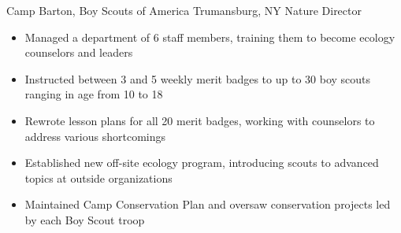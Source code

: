 
        {Camp Barton, Boy Scouts of America}
        {Trumansburg, NY}
        {Nature Director}
        {}{
    \begin{itemize}
        \item Managed a department of 6 staff members, training them to become ecology counselors and leaders
        \item Instructed between 3 and 5 weekly merit badges to up to 30 boy scouts ranging in age from 10 to 18
        \item Rewrote lesson plans for all 20 merit badges, working with counselors to address various shortcomings
        \item Established new off-site ecology program, introducing scouts to advanced topics at outside organizations
        \item Maintained Camp Conservation Plan and oversaw conservation projects led by each Boy Scout troop
    \end{itemize}
}
